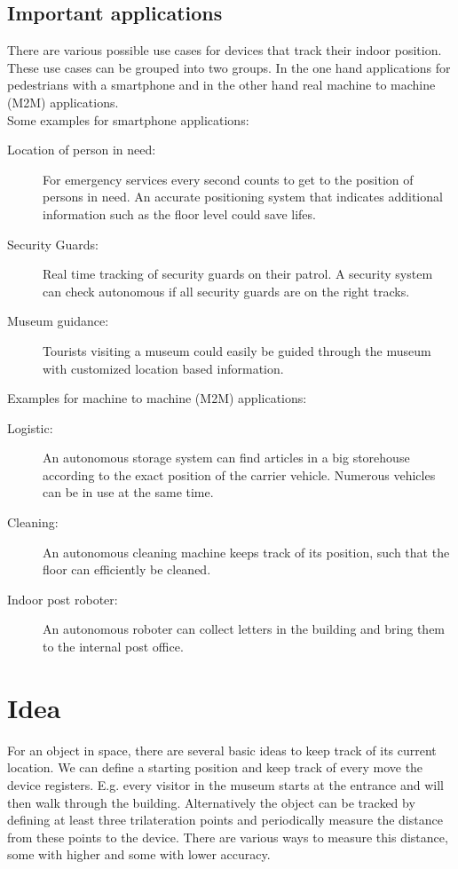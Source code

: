
\subsection{Important applications}
There are various possible use cases for devices that track their indoor position. These use cases can be grouped into two groups. In the one hand applications for pedestrians with a smartphone and in the other hand real machine to machine (M2M) applications. \\
Some examples for smartphone applications:
\begin{description}
\item [Location of person in need:] For emergency services every second counts to get to the position of persons in need. An accurate positioning system that indicates additional information such as the floor level could save lifes.
\item [Security Guards:] Real time tracking of security guards on their patrol. A security system can check autonomous if all security guards are on the right tracks.
\item [Museum guidance:] Tourists visiting a museum could easily be guided through the museum with customized location based information.
\end{description}
Examples for machine to machine (M2M) applications:
\begin{description}
\item [Logistic:] An autonomous storage system can find articles in a big storehouse according to the exact position of the carrier vehicle. Numerous vehicles can be in use at the same time.
\item [Cleaning:] An autonomous cleaning machine keeps track of its position, such that the floor can efficiently be cleaned.
\item [Indoor post roboter:] An autonomous roboter can collect letters in the building and bring them to the internal post office.
\end{description}



\section{Idea}
For an object in space, there are several basic ideas to keep track of its current location. We can define a starting position and keep track of every move the device registers. E.g. every visitor in the museum starts at the entrance and will then walk through the building.
Alternatively the object can be tracked by defining at least three trilateration points and periodically measure the distance from these points to the device. There are various ways to measure this distance, some with higher and some with lower accuracy.

